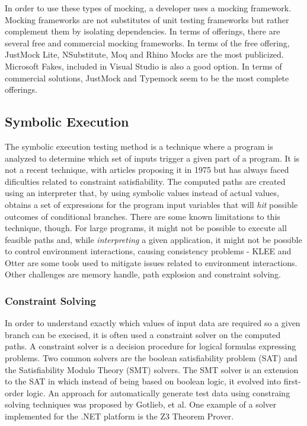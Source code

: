 \documentclass{sigchi}
\begin{document}
In order to use these types of mocking, a developer uses a mocking framework. Mocking frameworks are not substitutes of unit testing frameworks but rather complement them by isolating dependencies.
In terms of offerings, there are several free and commercial mocking frameworks. In terms of the free offering, JustMock Lite, NSubstitute, Moq and Rhino Mocks are the most publicized. Microsoft Fakes, included in Visual Studio is also a good option. In terms of commercial solutions, JustMock and Typemock seem to be the most complete offerings.

\subsection{Symbolic Execution}
The symbolic execution testing method is a technique where a program is analyzed to determine which set of inputs trigger a given part of a program\cite{King:1976:SEP:360248.360252}. It is not a recent technique, with articles proposing it in 1975\cite{Boyer:1975:SFS:390016.808445} but has always faced dificulties related to constraint satisfiability. The computed paths are created using an interpreter that, by using symbolic values instead of actual values, obtains a set of expressions for the program input variables that will \textit{hit} possible outcomes of conditional branches. There are some known limitations to this technique, though. For large programs, it might not be possible to execute all feasible paths\cite{Anand2008} and, while \textit{interpreting} a given application, it might not be possible to control environment interactions, causing consistency problems - KLEE\cite{Cadar:2008:KUA:1855741.1855756} and Otter\cite{otter} are some tools used to mitigate issues related to environment interactions.
Other challenges are memory handle, path explosion and constraint solving\cite{SurveySymExec-CSUR18}.

\subsubsection{Constraint Solving}
In order to understand exactly which values of input data are required so a given branch can be execised, it is often used a constraint solver on the computed paths. A constraint solver is a decision procedure for logical formulas expressing problems. Two common solvers are the boolean satisfiability problem (SAT) and the Satisfiability Modulo Theory (SMT) solvers. The SMT solver is an extension to the SAT in which instead of being based on boolean logic, it evolved into first-order logic\cite{6713475020110901}.
An approach for automatically generate test data using constraing solving techniques was proposed by Gotlieb, et al.\cite{Gotlieb:1998:ATD:271775.271790} One example of a solver implemented for the .NET platform is the Z3 Theorem Prover.
\end{document}
